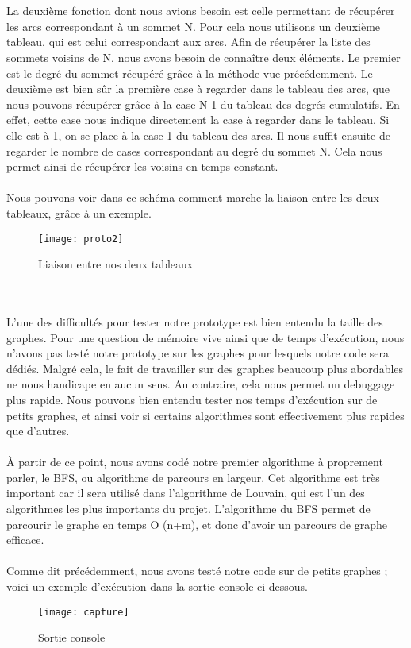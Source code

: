 \begin{titlepage}
{~\\ \\
	La deuxième fonction dont nous avions besoin est celle permettant de récupérer les arcs correspondant à un sommet N. Pour cela nous utilisons un deuxième tableau, qui est celui correspondant aux arcs. Afin de récupérer la liste des sommets voisins de N, nous avons besoin de connaître deux éléments. Le premier est le degré du sommet récupéré grâce à la méthode vue précédemment. Le deuxième est bien sûr la première case à regarder dans le tableau des arcs, que nous pouvons récupérer grâce à la case N-1 du tableau des degrés cumulatifs. En effet, cette case nous indique directement la case à regarder dans le tableau. Si elle est à 1, on se place à la case 1 du tableau des arcs. Il nous suffit ensuite de regarder le nombre de cases correspondant au degré du sommet N. Cela nous permet ainsi de récupérer les voisins en temps constant.
~\\ \\
	Nous pouvons voir dans ce schéma comment marche la liaison entre les deux tableaux, grâce à un exemple.
\begin{figure}[h]
\centering
\texttt{[image: proto2]}
\caption{Liaison entre nos deux tableaux}
\end{figure}
~\\ \\
	L'une des difficultés pour tester notre prototype est bien entendu la taille des graphes. Pour une question de mémoire vive ainsi que de temps d’exécution, nous n'avons pas testé notre prototype sur les graphes pour lesquels notre code sera dédiés. Malgré cela, le fait de travailler sur des graphes beaucoup plus abordables ne nous handicape en aucun sens. Au contraire, cela nous permet un debuggage plus rapide. Nous pouvons bien entendu tester nos temps d'exécution sur de petits graphes, et ainsi voir si certains algorithmes sont effectivement plus rapides que d'autres.
~\\ \\
	À partir de ce point, nous avons codé notre premier algorithme à proprement parler, le BFS, ou algorithme de parcours en largeur. Cet algorithme est très important car il sera utilisé dans l'algorithme de Louvain, qui est l'un des algorithmes les plus importants du projet. L'algorithme du BFS permet de parcourir le graphe en temps O (n+m), et donc d'avoir un parcours de graphe efficace. 
~\\ \\
	Comme dit précédemment, nous avons testé notre code sur de petits graphes ; voici un exemple d'exécution dans la sortie console ci-dessous.
\begin{figure}[h]
\centering
\texttt{[image: capture]}
\caption{Sortie console}
\end{figure}
\\ \\
}


\end{titlepage}
